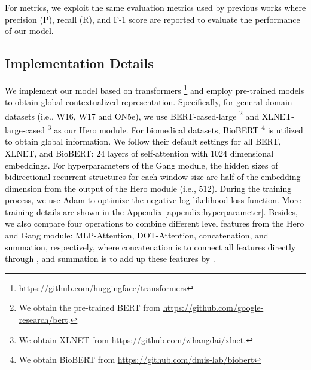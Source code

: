 \documentclass[11pt]{article}
\begin{document}
\textcolor{black}{For metrics, we exploit the same evaluation metrics used by previous works where precision (P), recall (R), and F-1 score are reported to evaluate the performance of our model.
}

\subsection{Implementation Details}
\textcolor{black}{
We implement our model based on transformers \cite{wolf2020transformers}\footnote{\url{https://github.com/huggingface/transformers}} and employ pre-trained models to obtain global contextualized representation.
Specifically, for general domain datasets (i.e., W16, W17 and ON5e), we use BERT-cased-large \cite{BERT}\footnote{We obtain the pre-trained BERT from \url{https://github.com/google-research/bert}.} and XLNET-large-cased \cite{yangxlnet}\footnote{We obtain XLNET from \url{https://github.com/zihangdai/xlnet}.} as our Hero module.
For biomedical datasets, BioBERT \cite{biobert}\footnote{We obtain BioBERT from \url{https://github.com/dmis-lab/biobert}} is utilized to obtain global information.
}
\textcolor{black}{
We follow their default settings for all BERT, XLNET, and BioBERT: 24 layers of self-attention with 1024 dimensional embeddings.
For hyperparameters of the Gang module, the hidden sizes of bidirectional recurrent structures for each window size are half of the embedding dimension from the output of the Hero module (i.e., 512).
During the training process, we use Adam \cite{adam} to optimize the negative log-likelihood loss function.
More training details are shown in the Appendix \ref{appendix:hyperparameter}.
Besides, we also compare four operations to combine different level features from the Hero and Gang module: MLP-Attention, DOT-Attention, concatenation, and summation, respectively, where concatenation is to connect all features directly through ,  and summation is to add up these features by .
}
\end{document}
